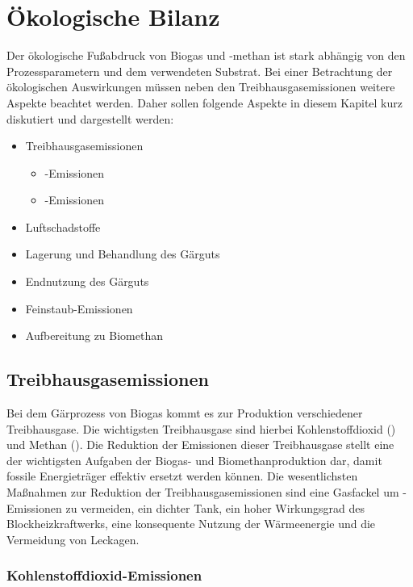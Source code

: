 \section{Ökologische Bilanz}

Der ökologische Fußabdruck von Biogas und -methan ist stark abhängig von den Prozessparametern und dem verwendeten Substrat. Bei einer Betrachtung der ökologischen Auswirkungen müssen neben den Treibhausgasemissionen weitere Aspekte beachtet werden. Daher sollen folgende Aspekte in diesem Kapitel kurz diskutiert und dargestellt werden:

\begin{itemize}
	\item Treibhausgasemissionen
	\begin{itemize}
		\item {}-Emissionen
		\item {}-Emissionen
	\end{itemize}
	\item Luftschadstoffe
	\item Lagerung und Behandlung des Gärguts
	\item Endnutzung des Gärguts
	\item Feinstaub-Emissionen
	\item Aufbereitung zu Biomethan
\end{itemize}


\subsection{Treibhausgasemissionen}

Bei dem Gärprozess von Biogas kommt es zur Produktion verschiedener Treibhausgase. Die wichtigsten Treibhausgase sind hierbei Kohlenstoffdioxid () und Methan (). Die Reduktion der Emissionen dieser Treibhausgase stellt eine der wichtigsten Aufgaben der Biogas- und Biomethanproduktion dar, damit fossile Energieträger effektiv ersetzt werden können. Die wesentlichsten Maßnahmen zur Reduktion der Treibhausgasemissionen sind eine Gasfackel um -Emissionen zu vermeiden, ein dichter Tank, ein hoher Wirkungsgrad des Blockheizkraftwerks, eine konsequente Nutzung der Wärmeenergie und die Vermeidung von Leckagen. \parencite{Paolini2018}


\subsubsection{Kohlenstoffdioxid-Emissionen}

